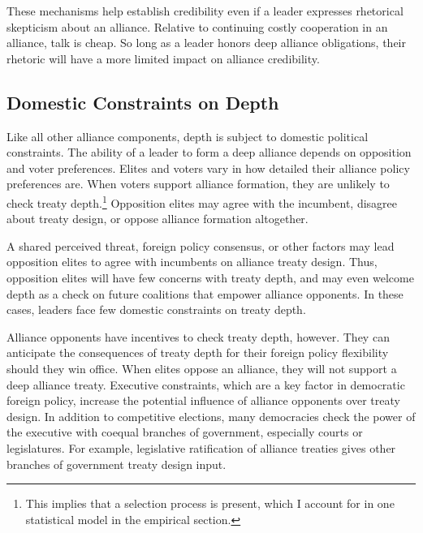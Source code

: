 \documentclass[12pt]{article}
\begin{document}


These mechanisms help establish credibility even if a leader expresses rhetorical skepticism about an alliance. 
Relative to continuing costly cooperation in an alliance, talk is cheap. 
So long as a leader honors deep alliance obligations, their rhetoric will have a more limited impact on alliance credibility. 




\subsection{Domestic Constraints on Depth} 

Like all other alliance components, depth is subject to domestic political constraints. 
The ability of a leader to form a deep alliance depends on opposition and voter preferences.
Elites and voters vary in how detailed their alliance policy preferences are. 
When voters support alliance formation, they are unlikely to check treaty depth.\footnote{This implies that a selection process is present, which I account for in one statistical model in the empirical section.} 
Opposition elites may agree with the incumbent, disagree about treaty design, or oppose alliance formation altogether. 


A shared perceived threat, foreign policy consensus, or other factors may lead opposition elites to agree with incumbents on alliance treaty design. 
Thus, opposition elites will have few concerns with treaty depth, and may even welcome depth as a check on future coalitions that empower alliance opponents. 
In these cases, leaders face few domestic constraints on treaty depth. 


Alliance opponents have incentives to check treaty depth, however.
They can anticipate the consequences of treaty depth for their foreign policy flexibility should they win office.
When elites oppose an alliance, they will not support a deep alliance treaty.  
Executive constraints, which are a key factor in democratic foreign policy, increase the potential influence of alliance opponents over treaty design.   
In addition to competitive elections, many democracies check the power of the executive with coequal branches of government, especially courts or legislatures.
For example, legislative ratification of alliance treaties gives other branches of government treaty design input. 
\end{document}
